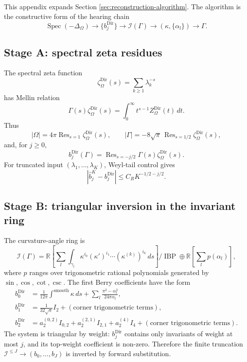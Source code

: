 \documentclass[11pt,reqno]{amsart}
\theoremstyle{plain}
\theoremstyle{definition}
\theoremstyle{remark}
\DeclareMathOperator{\Spec}{Spec}
\DeclareMathOperator{\Res}{Res}
\DeclareMathOperator{\IBP}{IBP}
\newcommand{\Reals}{\mathbb{R}}
\newcommand{\Icalbb}{\mathcal{I}}
\begin{document}
This appendix expands Section \ref{sec:reconstruction-algorithm}. The algorithm is the constructive form of the hearing chain
\[
\Spec(-\Delta_\Omega)\longrightarrow \{b_j^{\mathrm{Dir}}\}
\longrightarrow \Icalbb(\Gamma)
\longrightarrow (\kappa,\{\alpha_l\})
\longrightarrow \Gamma.
\]

\subsection{Stage A: spectral zeta residues}\label{app:ss-stage-A}

The spectral zeta function
\[
\zeta_\Omega^{\mathrm{Dir}}(s)=\sum_{k\geq1}\lambda_k^{-s}
\]
has Mellin relation
\[
\Gamma(s)\zeta_\Omega^{\mathrm{Dir}}(s)
=\int_0^\infty t^{s-1}Z_\Omega^{\mathrm{Dir}}(t)\,dt.
\]
Thus
\[
|\Omega|=4\pi\Res_{s=1}\zeta_\Omega^{\mathrm{Dir}}(s),\qquad
|\Gamma|=-8\sqrt\pi\,\Res_{s=1/2}\zeta_\Omega^{\mathrm{Dir}}(s),
\]
and, for $j\geq0$,
\[
b_j^{\mathrm{Dir}}(\Gamma)
=\Res_{s=-j/2}\Gamma(s)\zeta_\Omega^{\mathrm{Dir}}(s).
\]
For truncated input $(\lambda_1,\dots,\lambda_K)$, Weyl-tail control gives
\[
|\widehat b_j^{K}-b_j^{\mathrm{Dir}}|
\leq C_RK^{-1/2-j/2}.
\]

\subsection{Stage B: triangular inversion in the invariant ring}\label{app:ss-stage-B}

The curvature-angle ring is
\[
\Icalbb(\Gamma)=
\Reals\left[
\sum_l\int_{\gamma_l}\kappa^{i_0}(\kappa')^{i_1}\cdots(\kappa^{(k)})^{i_k}\,ds
\right]/\IBP
\oplus
\Reals\left[\sum_l p(\alpha_l)\right],
\]
where $p$ ranges over trigonometric rational polynomials generated by $\sin,\cos,\cot,\csc$. The first Berry coefficients have the form
\begin{align*}
b_0^{\mathrm{Dir}}&=\frac{1}{12\pi}\int^{\mathrm{smooth}}\kappa\,ds
+\sum_l\frac{\pi^2-\alpha_l^2}{24\pi\alpha_l},\\
b_1^{\mathrm{Dir}}&=\frac{1}{32\sqrt\pi}I_2+(\text{corner trigonometric terms}),\\
b_2^{\mathrm{Dir}}&=a_2^{(0,2)}I_{0,2}+a_2^{(2,1)}I_{2,1}
+a_2^{(4)}I_4+(\text{corner trigonometric terms}).
\end{align*}
The system is triangular by weight: $b_j^{\mathrm{Dir}}$ contains only invariants of weight at most $j$, and its top-weight coefficient is non-zero. Therefore the finite truncation $\Icalbb^{\leq J}\to (b_0,\dots,b_J)$ is inverted by forward substitution.
\end{document}
